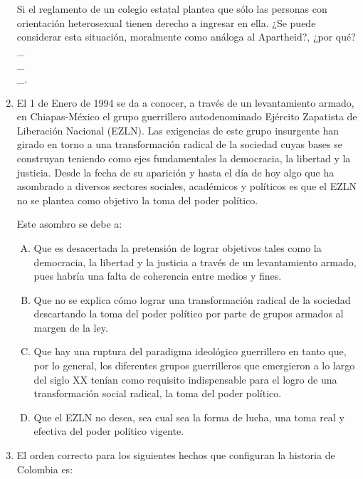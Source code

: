 \begin{enumerate}
Si el reglamento de un colegio estatal plantea que sólo las personas con orientación heterosexual tienen derecho a ingresar en ella. ¿Se puede considerar esta situación, moralmente como análoga al Apartheid?, ¿por qué?
\hrulefill\\
\_\hrulefill\\
\_\hrulefill\\
\_\hrulefill.

\item El 1 de Enero de 1994 se da a conocer, a través de un levantamiento armado, en Chiapas-México el grupo guerrillero autodenominado Ejército Zapatista de Liberación Nacional (EZLN). Las exigencias de este grupo insurgente han girado en torno a una transformación radical de la sociedad cuyas bases se construyan teniendo como ejes fundamentales la democracia, la libertad y la justicia. Desde la fecha de su aparición y hasta el día de hoy algo que ha asombrado a diversos sectores sociales, académicos y políticos es que el EZLN no se plantea como objetivo la toma del poder político. \label{socandres-16}

Este asombro se debe a:

\begin{enumerate}[(A)]
\item Que es desacertada la pretensión de lograr objetivos tales como la democracia, la libertad y la justicia a través de un levantamiento armado, pues habría una falta de coherencia entre medios y fines.
\item Que no se explica cómo lograr una transformación radical de la sociedad descartando la toma del poder político por parte de grupos armados al margen de la ley.
\item Que hay una ruptura del paradigma ideológico guerrillero en tanto que, por lo general, los diferentes grupos guerrilleros que emergieron a lo largo del siglo XX tenían como requisito indispensable para el logro de una transformación social radical, la toma del poder político.
\item Que el EZLN no desea, sea cual sea la forma de lucha, una toma real y efectiva del poder político vigente.
\end{enumerate}

\item El  orden correcto para los siguientes hechos que configuran la historia de Colombia es:\label{socandres-17}


\end{enumerate}
